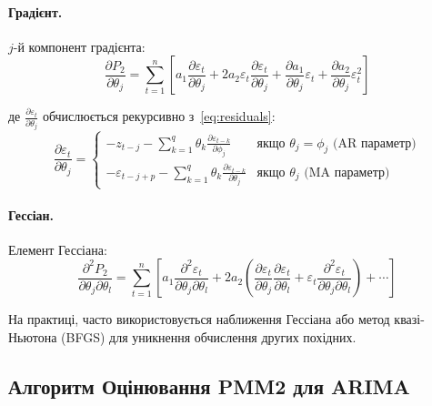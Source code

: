 \documentclass[12pt,a4paper]{article}
\begin{document}
	\paragraph{Градієнт.}
	
	$j$-й компонент градієнта:
	\begin{equation}
		\label{eq:gradient_j}
		\frac{\partial P_2}{\partial \theta_j} = \sum_{t=1}^{n} \left[ a_1 \frac{\partial \varepsilon_t}{\partial \theta_j} + 2 a_2 \varepsilon_t \frac{\partial \varepsilon_t}{\partial \theta_j} + \frac{\partial a_1}{\partial \theta_j} \varepsilon_t + \frac{\partial a_2}{\partial \theta_j} \varepsilon_t^2 \right]
	\end{equation}
	
	де $\frac{\partial \varepsilon_t}{\partial \theta_j}$ обчислюється рекурсивно з~\eqref{eq:residuals}:
	\begin{equation}
		\label{eq:residual_derivative}
		\frac{\partial \varepsilon_t}{\partial \theta_j} = \begin{cases}
			-z_{t-j} - \sum_{k=1}^{q} \theta_k \frac{\partial \varepsilon_{t-k}}{\partial \phi_j} & \text{якщо } \theta_j = \phi_j \text{ (AR параметр)} \\
			-\varepsilon_{t-j+p} - \sum_{k=1}^{q} \theta_k \frac{\partial \varepsilon_{t-k}}{\partial \theta_j} & \text{якщо } \theta_j \text{ (MA параметр)}
		\end{cases}
	\end{equation}
	
	\paragraph{Гессіан.}
	
	Елемент Гессіана:
	\begin{equation}
		\label{eq:hessian_jl}
		\frac{\partial^2 P_2}{\partial \theta_j \partial \theta_l} = \sum_{t=1}^{n} \left[ a_1 \frac{\partial^2 \varepsilon_t}{\partial \theta_j \partial \theta_l} + 2 a_2 \left( \frac{\partial \varepsilon_t}{\partial \theta_j} \frac{\partial \varepsilon_t}{\partial \theta_l} + \varepsilon_t \frac{\partial^2 \varepsilon_t}{\partial \theta_j \partial \theta_l} \right) + \cdots \right]
	\end{equation}
	
	На практиці, часто використовується наближення Гессіана або метод квазі-Ньютона (BFGS) для уникнення обчислення других похідних.
	
	\subsection{Алгоритм Оцінювання PMM2 для ARIMA}
	\label{subsec:algorithm}
	
\end{document}
